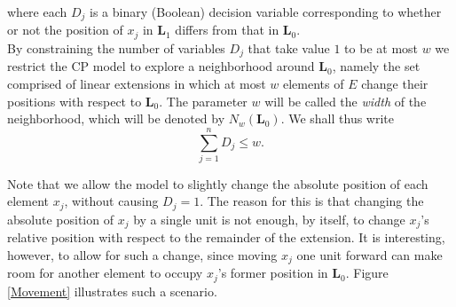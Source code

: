\documentclass{llncs}
\begin{document}
\noindent where each $D_j$ is a binary (Boolean) decision variable corresponding to whether or not the position of $x_j$ in $\mathbf{L}_1$ differs from that in $\mathbf{L}_0$.\\

By constraining the number of variables $D_j$ that take value $1$ to be at most $w$ we restrict the CP model to explore a neighborhood around $\mathbf{L}_0$, namely the set comprised of linear extensions in which at most $w$ elements of $E$ change their positions with respect to $\mathbf{L}_0$. The parameter $w$ will be called the \emph{width} of the neighborhood, which will be denoted by $N_w(\mathbf{L}_0)$. We shall thus write
\begin{equation}
\sum_{j=1}^n D_j \leq w.
\end{equation}

Note that we allow the model to slightly change the absolute position of each element $x_j$, without causing $D_j=1$. The reason for this is that changing the absolute position of $x_j$ by a single unit is not enough, by itself, to change $x_j$'s relative position with respect to the remainder of the extension. It is interesting, however, to allow for such a change, since moving $x_j$ one unit forward can make room for another element to occupy $x_j$'s former position in $\mathbf{L}_0$. Figure \ref{Movement} illustrates such a scenario.\\
\end{document}
